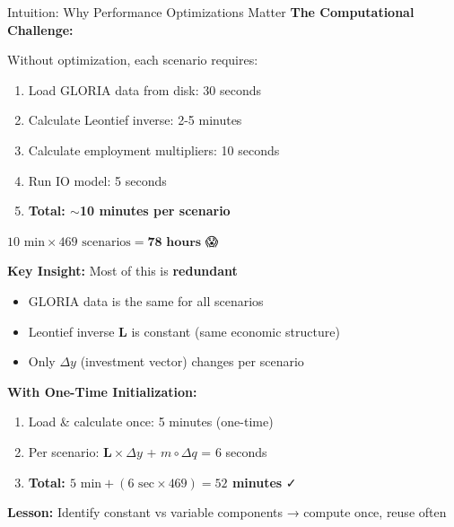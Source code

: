 \documentclass[10pt]{beamer}
\begin{document}
\begin{frame}{Intuition: Why Performance Optimizations Matter}
\textbf{The Computational Challenge:}

\vspace{0.3cm}

Without optimization, each scenario requires:
\begin{enumerate}
    \item Load GLORIA data from disk: 30 seconds
    \item Calculate Leontief inverse: 2-5 minutes
    \item Calculate employment multipliers: 10 seconds
    \item Run IO model: 5 seconds
    \item \textbf{Total: $\sim$10 minutes per scenario}
\end{enumerate}

\vspace{0.2cm}

$10 \text{ min} \times 469 \text{ scenarios} = \textbf{78 hours}$ 😱

\vspace{0.4cm}

\textbf{Key Insight:} Most of this is \textbf{redundant}
\begin{itemize}
    \item GLORIA data is the same for all scenarios
    \item Leontief inverse $\mathbf{L}$ is constant (same economic structure)
    \item Only $\Delta y$ (investment vector) changes per scenario
\end{itemize}

\vspace{0.4cm}

\textbf{With One-Time Initialization:}
\begin{enumerate}
    \item Load \& calculate once: 5 minutes (one-time)
    \item Per scenario: $\mathbf{L} \times \Delta y$ + $m \circ \Delta q$ = 6 seconds
    \item \textbf{Total: $5 \text{ min} + (6 \text{ sec} \times 469) = 52$ minutes} ✓
\end{enumerate}

\vspace{0.3cm}

\textbf{Lesson:} Identify constant vs variable components → compute once, reuse often

\end{frame}
\end{document}
